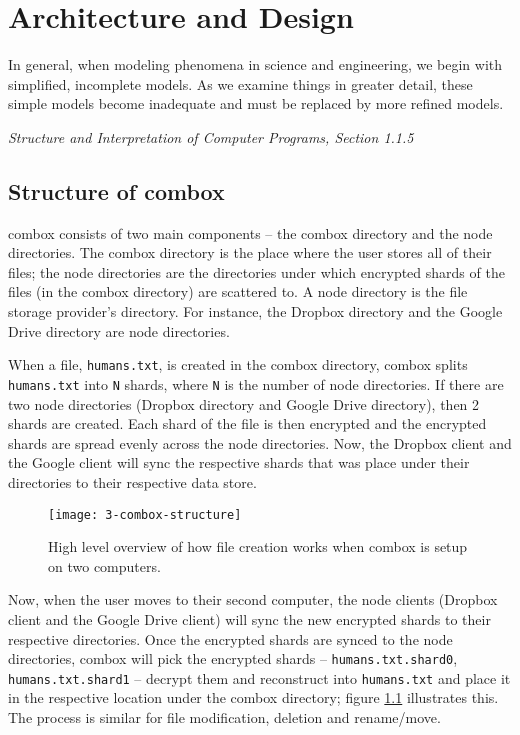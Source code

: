 \chapter{Architecture and Design}

\epigraph{In general, when modeling phenomena in science and
  engineering, we begin with simplified, incomplete models. As we
  examine things in greater detail, these simple models become
  inadequate and must be replaced by more refined
  models.}{\textit{Structure and Interpretation of Computer Programs,
    Section 1.1.5}\cite{sicp}}

\section{Structure of combox}

combox consists of two main components -- the combox directory and the
node directories. The combox directory is the place where the user
stores all of their files; the node directories are the directories under
which encrypted shards of the files (in the combox directory) are
scattered to. A node directory is the file storage provider's
directory. For instance, the Dropbox directory and the Google Drive
directory are node directories.

When a file, \verb+humans.txt+, is created in the combox directory,
combox splits \verb+humans.txt+ into \verb+N+ shards, where \verb+N+
is the number of node directories. If there are two node directories
(Dropbox directory and Google Drive directory), then 2 shards are
created. Each shard of the file is then encrypted and the encrypted
shards are spread evenly across the node directories. Now, the Dropbox client and
the Google client will sync the respective shards that was place under
their directories to their respective data store.

\begin{figure}[h]
\texttt{[image: 3-combox-structure]}
\caption{High level overview of how file creation works when combox is
  setup on two computers.}
\label{fig:3-combox-structure}
\end{figure}

Now, when the user moves to their second computer, the node clients
(Dropbox client and the Google Drive client) will sync the new
encrypted shards to their respective directories. Once the encrypted
shards are synced to the node directories, combox will pick the
encrypted shards -- \verb+humans.txt.shard0+, \verb+humans.txt.shard1+
-- decrypt them and reconstruct into \verb+humans.txt+ and place it in
the respective location under the combox directory; figure
\ref{fig:3-combox-structure} illustrates this. The process is similar
for file modification, deletion and rename/move.

